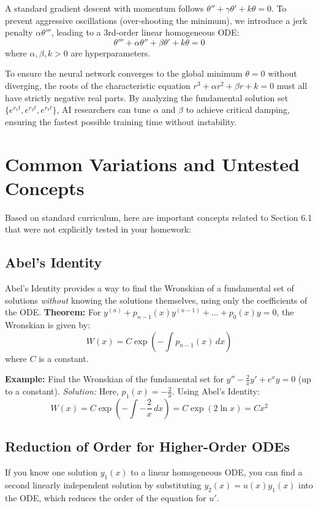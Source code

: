 \documentclass[11pt, a4paper]{article}
\theoremstyle{definition}
\theoremstyle{remark}
\begin{document}
A standard gradient descent with momentum follows $\theta'' + \gamma \theta' + k\theta = 0$. To prevent aggressive oscillations (over-shooting the minimum), we introduce a jerk penalty $\alpha \theta'''$, leading to a 3rd-order linear homogeneous ODE:
\[ \theta''' + \alpha \theta'' + \beta \theta' + k \theta = 0 \]
where $\alpha, \beta, k > 0$ are hyperparameters. 

To ensure the neural network converges to the global minimum $\theta = 0$ without diverging, the roots of the characteristic equation $r^3 + \alpha r^2 + \beta r + k = 0$ must all have strictly negative real parts. By analyzing the fundamental solution set $\{e^{r_1 t}, e^{r_2 t}, e^{r_3 t}\}$, AI researchers can tune $\alpha$ and $\beta$ to achieve critical damping, ensuring the fastest possible training time without instability.

\newpage
\section{Common Variations and Untested Concepts}

Based on standard curriculum, here are important concepts related to Section 6.1 that were not explicitly tested in your homework:

\subsection{Abel's Identity}
Abel's Identity provides a way to find the Wronskian of a fundamental set of solutions \textit{without} knowing the solutions themselves, using only the coefficients of the ODE.
\textbf{Theorem:} For $y^{(n)} + p_{n-1}(x)y^{(n-1)} + \dots + p_0(x)y = 0$, the Wronskian is given by:
\[ W(x) = C \exp\left( -\int p_{n-1}(x) \, dx \right) \]
where $C$ is a constant.

\textbf{Example:} Find the Wronskian of the fundamental set for $y'' - \frac{2}{x}y' + e^x y = 0$ (up to a constant).
\textit{Solution:} Here, $p_1(x) = -\frac{2}{x}$. Using Abel's Identity:
\[ W(x) = C \exp\left( -\int -\frac{2}{x} \, dx \right) = C \exp(2 \ln x) = C x^2 \]

\subsection{Reduction of Order for Higher-Order ODEs}
If you know one solution $y_1(x)$ to a linear homogeneous ODE, you can find a second linearly independent solution by substituting $y_2(x) = u(x)y_1(x)$ into the ODE, which reduces the order of the equation for $u'$.
\end{document}
